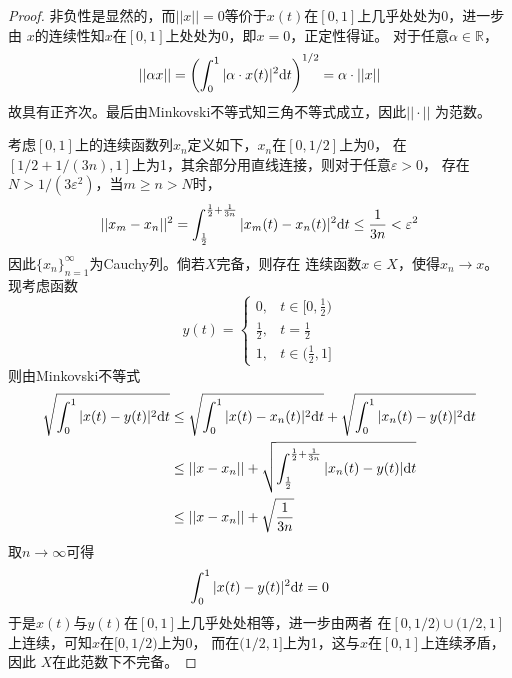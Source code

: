 \documentclass[cn]{homework}
\begin{document}
    \problem
    \begin{proof}
        非负性是显然的，而$||x||=0$等价于$x(t)$在$[0,1]$上几乎处处为0，进一步由
        $x$的连续性知$x$在$[0,1]$上处处为0，即$x=0$，正定性得证。
        对于任意$\alpha\in\mathbb R$，
        \[||\alpha x||=\left(\int_0^1|\alpha\cdot x(t)|^2\mathrm d t\right)^{1/2}
        =\alpha\cdot||x||\]
        故具有正齐次。最后由Minkovski不等式知三角不等式成立，因此$||\cdot||$
        为范数。
        
        考虑$[0,1]$上的连续函数列$x_n$定义如下，$x_n$在$[0,1/2]$上为0，
        在$[1/2+1/(3n),1]$上为1，其余部分用直线连接，则对于任意$\varepsilon>0$，
        存在$N>1/(3\varepsilon^2)$，当$m\geq n>N$时，
        \[\begin{aligned}
            ||x_m-x_n||^2=\int_{\frac{1}{2}}^{\frac{1}{2}+\frac{1}{3n}}
            |x_m(t)-x_n(t)|^2\mathrm d t
            \leq\frac{1}{3n}<\varepsilon^2
        \end{aligned}\]        
        因此$\{x_n\}_{n=1}^\infty$为Cauchy列。倘若$X$完备，则存在
        连续函数$x\in X$，使得$x_n\to x$。现考虑函数
        \[y(t)=\begin{cases}
            0,&t\in[0,\frac{1}{2})\\
            \frac{1}{2},&t=\frac{1}{2}\\
            1,&t\in(\frac{1}{2},1]
        \end{cases}\]
        则由Minkovski不等式
        \[\begin{aligned}
            \sqrt{\int_0^1|x(t)-y(t)|^2\mathrm d t}
            &\leq\sqrt{\int_0^1|x(t)-x_n(t)|^2\mathrm d t}
            +\sqrt{\int_0^1|x_n(t)-y(t)|^2\mathrm d t}\\
            &\leq ||x-x_n||+\sqrt{\int_{\frac{1}{2}}^{\frac{1}{2}+\frac{1}{3n}}
             |x_n(t)-y(t)|\mathrm d t}\\
            &\leq ||x-x_n||+\sqrt{\frac{1}{3n}}
        \end{aligned}\]
        取$n\to\infty$可得
        \[\int_0^1|x(t)-y(t)|^2\mathrm d t=0\]
        于是$x(t)$与$y(t)$在$[0,1]$上几乎处处相等，进一步由两者
        在$[0,1/2)\cup (1/2,1]$上连续，可知$x$在$[0,1/2)$上为0，
        而在$(1/2,1]$上为1，这与$x$在$[0,1]$上连续矛盾，因此
        $X$在此范数下不完备。
    \end{proof}
\end{document}
